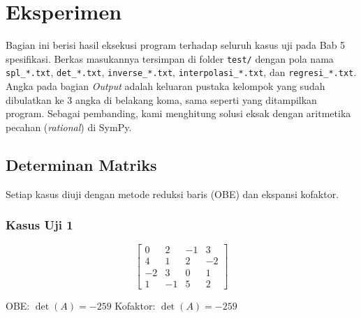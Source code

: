 \clearpage
\section{Eksperimen}

Bagian ini berisi hasil eksekusi program terhadap seluruh kasus uji pada Bab 5 spesifikasi. Berkas masukannya tersimpan di folder \texttt{test/} dengan pola nama \texttt{spl\_*.txt}, \texttt{det\_*.txt}, \texttt{inverse\_*.txt}, \texttt{interpolasi\_*.txt}, dan \texttt{regresi\_*.txt}. Angka pada bagian \textit{Output} adalah keluaran pustaka kelompok yang sudah dibulatkan ke 3 angka di belakang koma, sama seperti yang ditampilkan program. Sebagai pembanding, kami menghitung solusi eksak dengan aritmetika pecahan (\textit{rational}) di SymPy.

\subsection{Determinan Matriks}

Setiap kasus diuji dengan metode reduksi baris (OBE) dan ekspansi kofaktor.

\subsubsection{Kasus Uji 1}
\begin{kasus}
\[
\begin{bmatrix}
0 & 2 & -1 & 3 \\
4 & 1 & 2 & -2 \\
-2 & 3 & 0 & 1 \\
1 & -1 & 5 & 2
\end{bmatrix}
\]
\begin{center}
OBE: $\det(A) = -259$ \qquad Kofaktor: $\det(A) = -259$
\end{center}
\begin{center}
    \begin{minipage}{0.48\textwidth}
        \centering
    \end{minipage}\hfill
    \begin{minipage}{0.48\textwidth}
        \centering
    \end{minipage}
\end{center}
\end{kasus}

